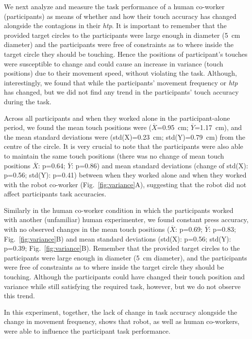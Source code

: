 We next analyze and measure the task performance of a human co-worker (participants) as means of whether and how their touch accuracy has changed alongside the contagions in their \textit{htp}. It is important to remember that the provided target circles to the participants were large enough in diameter (5~cm diameter) and the participants were free of constraints as to where inside the target circle they should be touching. Hence the positions of participant's touches were susceptible to change and could cause an increase in variance (touch positions) due to their movement speed, without violating the task. Although, interestingly, we found that while the participants' movement frequency or {\it htp} has changed, but we did not find any trend in the participants' touch accuracy during the task. 

Across all participants and when they worked alone in the participant-alone period, we found the mean touch positions were ($\overline{X}$=0.95~cm; $\overline{Y}$=1.17~cm), and the mean standard deviations were (std(X)=0.23~cm; std(Y)=0.79~cm) from the centre of the circle. It is very crucial to note that the participants were also able to maintain the same touch positions (there was no change of mean touch positions $\overline{X}$: p=0.64; $\overline{Y}$: p=0.86) and mean standard deviations (change of std(X): p=0.56; std(Y): p=0.41) between when they worked alone and when they worked with the robot co-worker (Fig.~\ref{fig:variance}A), suggesting that the robot did not affect participants task accuracies.

Similarly in the human co-worker condition in which the participants worked with another (unfamiliar) human experimenter, we found constant press accuracy, with no observed changes in the mean touch positions ($\overline{X}$: p=0.69; $\overline{Y}$: p=0.83; Fig.~\ref{fig:variance}B) and mean standard deviations (std(X): p=0.56; std(Y): p=0.39; Fig.~\ref{fig:variance}B). Remember that the provided target circles to the participants were large enough in diameter (5~cm diameter), and the participants were free of constraints as to where inside the target circle they should be touching. Although the participants could have changed their touch position and variance while still satisfying the required task, however, but we do not observe this trend. 

In this experiment, together, the lack of change in task accuracy alongside the change in movement frequency, shows that robot, as well as human co-workers, were able to influence the participant task performance.


